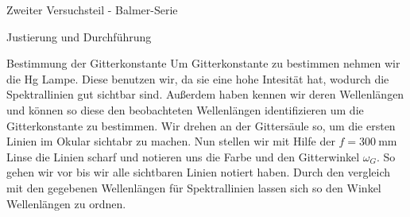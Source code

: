 \documentclass[pdftex, a4paper,11pt, twoside, ngerman]{report}
\begin{document}
\begin{chapter}{Zweiter Versuchsteil - Balmer-Serie}
\begin{section}{Justierung und Durchführung}
      \begin{subsection}{Bestimmung der Gitterkonstante}
        \label{chp:Balmer:sec:JusitierungDurchfuehrung:subsec:Gitter}
        Um Gitterkonstante zu bestimmen nehmen wir die Hg Lampe. Diese benutzen
        wir, da sie eine hohe Intesität hat, wodurch die Spektrallinien gut
        sichtbar sind. Außerdem haben kennen wir deren Wellenlängen und können
        so diese den beobachteten Wellenlängen identifizieren um die
        Gitterkonstante zu bestimmen. Wir drehen an der Gittersäule so, um die
        ersten Linien im Okular sichtabr zu machen. Nun stellen wir mit Hilfe
        der $f=\SI{300}{\milli\meter}$ Linse die Linien scharf und notieren
        uns die Farbe und den Gitterwinkel $\omega_G$. So gehen wir vor bis
        wir alle sichtbaren Linien notiert haben. Durch den vergleich mit den
        gegebenen Wellenlängen für Spektrallinien lassen sich so den Winkel
        Wellenlängen zu ordnen.
       

\end{subsection}
\end{section}
\end{chapter}
\end{document}
